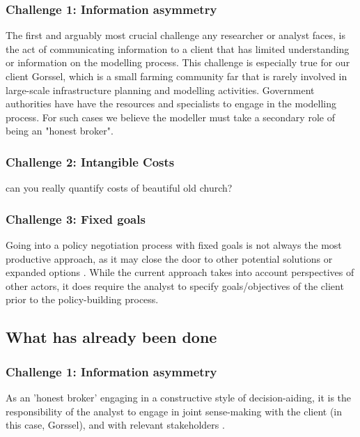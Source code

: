 \subsubsection{Challenge 1: Information asymmetry}
The first and arguably most crucial challenge any researcher or analyst faces, is the act of communicating information to a client that has limited understanding or information on the modelling process. This challenge is especially true for our client Gorssel, which is a small farming community far that is rarely involved in large-scale infrastructure planning and modelling activities. Government authorities have have the resources and specialists to engage in the modelling process.
For such cases we believe the modeller must take a secondary role of being an "honest broker".



\subsubsection{Challenge 2: Intangible Costs}
can you really quantify costs of beautiful old church?

\subsubsection{Challenge 3: Fixed goals}
Going into a policy negotiation process with fixed goals is not always the most productive approach, as it may close the door to other potential solutions or expanded options \parencite{de_bruijn_management_2018}. While the current approach takes into account perspectives of other actors, it does require the analyst to specify goals/objectives of the client prior to the policy-building process.

     

\subsection{What has already been done}
\subsubsection{Challenge 1: Information asymmetry}
As an 'honest broker' engaging in a constructive style of decision-aiding, it is the responsibility of the analyst to engage in joint sense-making with the client (in this case, Gorssel), and with relevant stakeholders \parencite{tsoukias_decision_2008}. 

